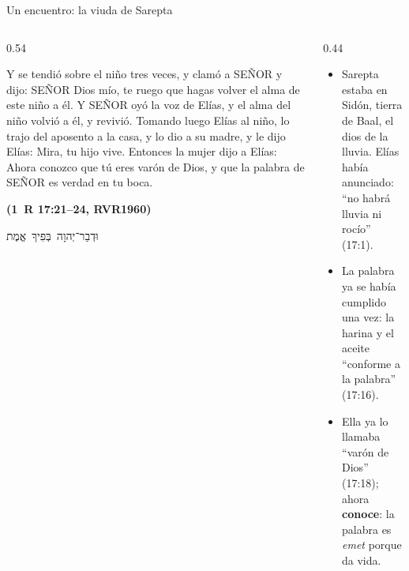 \documentclass[hyperref={bookmarks=false},aspectratio=169]{beamer}
\newcommand{\heb}[1]{\mbox{\foreignlanguage{hebrew}{#1}}}
\newcommand{\SENOR}{S{\fontsize{0.78em}{1em}\selectfont EÑOR}}
\newcommand{\fuente}[1]{\par\hfill{\upshape\bfseries\footnotesize\textcolor{azul}{#1}}}
\newcommand{\destacar}[1]{\textbf{\textcolor{azul}{#1}}}
\begin{document}
\begin{frame}{Un encuentro: la viuda de Sarepta}
\begin{columns}[t,onlytextwidth]
\begin{column}{0.54\textwidth}
\begin{cita}Y se tendió sobre el niño tres veces, y clamó a \SENOR{} y dijo: \SENOR{} Dios mío, te ruego que hagas volver el alma de este niño a él. Y \SENOR{} oyó la voz de Elías, y el alma del niño volvió a él, y revivió. Tomando luego Elías al niño, lo trajo del aposento a la casa, y lo dio a su madre, y le dijo Elías: Mira, tu hijo vive. Entonces la mujer dijo a Elías: Ahora conozco que tú eres varón de Dios, y que la palabra de \SENOR{} es verdad en tu boca.\fuente{(1~R 17:21--24, RVR1960)}\end{cita}
\begin{center}\heb{וּדְבַר־יְהוָה בְּפִיךָ אֱמֶת}\end{center}
\end{column}
\begin{column}{0.44\textwidth}\small
\begin{itemize}
\item Sarepta estaba en Sidón, tierra de Baal, el dios de la lluvia. Elías había anunciado: ``no habrá lluvia ni rocío'' (17:1).
\item La palabra ya se había cumplido una vez: la harina y el aceite ``conforme a la palabra'' (17:16).
\item Ella ya lo llamaba ``varón de Dios'' (17:18); ahora \destacar{conoce}: la palabra es \emph{emet} porque da vida.
\end{itemize}
\end{column}
\end{columns}
\end{frame}
\end{document}
